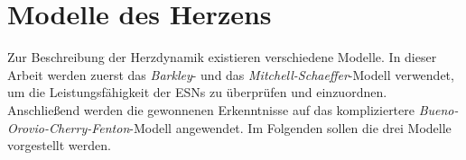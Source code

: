 \section{Modelle des Herzens}
Zur Beschreibung der Herzdynamik existieren verschiedene Modelle. In dieser Arbeit werden zuerst das \textit{Barkley}- und das \textit{Mitchell-Schaeffer}-Modell verwendet, um die Leistungsfähigkeit der \textsc{ESN}s zu überprüfen und einzuordnen. Anschließend werden die gewonnenen Erkenntnisse auf das kompliziertere \textit{Bueno-Orovio-Cherry-Fenton}-Modell angewendet. Im Folgenden sollen die drei Modelle vorgestellt werden.





\clearpage